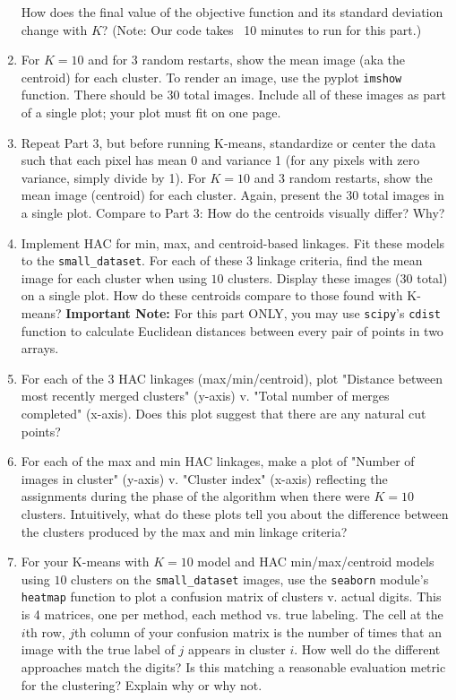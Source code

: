 \documentclass[submit]{harvardml}
\begin{document}
\begin{problem}
\begin{enumerate}
  How does the final value of the objective function and its standard deviation change with $K$? (Note: Our code takes ~10 minutes to run for this part.)
  
\item For $K=10$ and for 3 random restarts, show the mean
  image (aka the centroid) for each cluster.
  To render an image, use the pyplot
  \texttt{imshow} function. There should be 30 total images. Include all of these images
  as part of a single plot; your plot must fit on one page.

\item Repeat Part 3, but before running K-means, standardize or center the data such that each pixel has mean
  0 and variance 1 (for any pixels with zero variance, simply divide by 1). For $K=10$ and 3 random restarts,
  show the mean image (centroid) for each cluster. Again, present the 30 total images in a single plot. Compare to Part 3: How do the centroids visually differ? Why? 

\item Implement HAC for min, max, and centroid-based linkages. Fit these models to the \texttt{small\_dataset}. 
  For each of these 3 linkage criteria, find the mean image for each cluster when using $10$ clusters. Display these images (30 total) on a single plot.
  How do these centroids compare to those found with K-means? \textbf{Important Note:} For this part ONLY, you may use \texttt{scipy}'s \texttt{cdist} function to calculate Euclidean distances between every pair of points in two arrays.

\item For each of the 3 HAC linkages (max/min/centroid), plot
  "Distance between most recently merged clusters" (y-axis) v. "Total number of merges completed" (x-axis).
  Does this plot suggest that there are any  natural cut points? 

\item For each of the max and min HAC linkages, make a plot of "Number of images in cluster" (y-axis) v. "Cluster index" (x-axis) reflecting the assignments during
	the phase of the algorithm when there were $K=10$
	clusters. Intuitively, what do these plots tell you about the difference between the clusters produced by the max and min linkage criteria?

\item For your K-means with $K = 10$ model and HAC min/max/centroid models using $10$ clusters on the \texttt{small\_dataset} images, use the \texttt{seaborn} module's \texttt{heatmap} function to plot a confusion matrix of clusters v. actual digits. This is 4 matrices, one per method, each method vs. true labeling. The cell at the $i$th row, $j$th column of your confusion matrix is the number of times that an image with the true label of $j$ appears in cluster $i$. How well do the different approaches match the digits? Is this matching a reasonable evaluation metric for the clustering?  Explain why or why not.   
  
\end{enumerate}

\end{problem}
\end{document}
